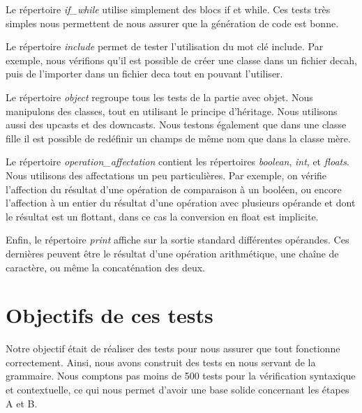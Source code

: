 \documentclass[12pt, a4paper, one side]{article}
\begin{document}
\begin{flushleft}
Le répertoire \textit{if\_while} utilise simplement des blocs if et while. Ces tests très simples nous permettent de nous assurer que la génération de code est bonne.
\end{flushleft}

\begin{flushleft}
Le répertoire \textit{include} permet de tester l'utilisation du mot clé include. Par exemple, nous vérifions qu'il est possible de créer une classe dans un fichier decah, puis de l'importer dans un fichier deca tout en pouvant l'utiliser. 
\end{flushleft}

\begin{flushleft}
Le répertoire \textit{object} regroupe tous les tests de la partie avec objet. Nous manipulons des classes, tout en utilisant le principe d'héritage. Nous utilisons aussi des upcasts et des downcasts. Nous testons également que dans une classe fille il est possible de redéfinir un champs de même nom que dans la classe mère.
\end{flushleft}

\begin{flushleft}
Le répertoire \textit{operation\_affectation} contient les répertoires \textit{boolean}, \textit{int}, et \textit{floats}. Nous utilisons des affectations un peu particulières. Par exemple, on vérifie l'affection du résultat d'une opération de comparaison à un booléen, ou encore l'affection à un entier du résultat d'une opération avec plusieurs opérande et dont le résultat est un flottant, dans ce cas la conversion en float est implicite.
\end{flushleft}

\begin{flushleft}
Enfin, le répertoire \textit{print} affiche sur la sortie standard différentes opérandes. Ces dernières peuvent être le résultat d'une opération arithmétique, une chaîne de caractère, ou même la concaténation des deux.
\end{flushleft}

\section{Objectifs de ces tests}
Notre objectif était de réaliser des tests pour nous assurer que tout fonctionne correctement. Ainsi, nous avons construit des tests en nous servant de la grammaire. Nous comptons pas moins de 500 tests pour la vérification syntaxique et contextuelle, ce qui nous permet d'avoir une base solide concernant les étapes A et B.
\end{document}
